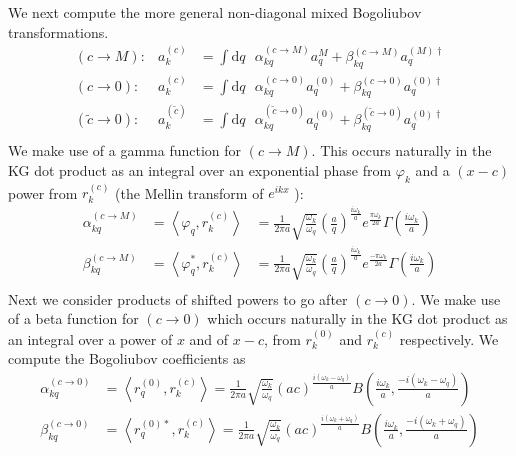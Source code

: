 \documentclass[12pt,a4paper]{article}
\newcommand{\dv}[1]{\mathrm{d} #1 \text{ }}
\begin{document}
We next compute the more general non-diagonal mixed Bogoliubov transformations.
\begin{equation}
  \begin{array}{rll}
  (c \rightarrow M) : & a^{(c)}_k &= \int \dv{q} \alpha^{(c \rightarrow M)}_{kq} a^{M}_q + \beta^{(c \rightarrow M)}_{kq} a^{(M)\dagger}_q \\
  (c \rightarrow 0) : &   a^{(c)}_k &= \int \dv{q} \alpha^{(c \rightarrow 0)}_{kq} a^{(0)}_q + \beta^{(c \rightarrow 0)}_{kq} a^{(0)\dagger}_q \\
  (\widetilde{c} \rightarrow 0) : &   a^{(\tilde{c})}_k &= \int \dv{q} \alpha^{(\widetilde{c} \rightarrow 0)}_{kq} a^{(0)}_q + \beta^{(\widetilde{c} \rightarrow 0)}_{kq} a^{(0)\dagger}_q \\
  \end{array}
\end{equation}
We make use of a gamma function for $(c \rightarrow M)$. This occurs naturally in the KG dot product as an integral over an exponential phase from $\varphi_k$ and a $(x-c)$ power from $r_k^{(c)}$ (the Mellin transform of $e^{ikx}$ \cite{bracewell1966fourier}):
\begin{equation}
  \begin{array}{ccl}
    \alpha^{(c \rightarrow M)}_{kq} &= \left<\varphi_q, r_k^{(c)} \right> &= \frac{1}{2 \pi a} \sqrt{\frac{\omega_k}{\omega_q}} \left(\frac{a}{q}\right)^{\frac{i\omega_k}{a}} e^{\frac{\pi \omega_k}{2a}} \Gamma\left(\frac{i\omega_k}{a}\right) \\
    \beta^{(c \rightarrow M)}_{kq} &= \left<\varphi_q^*, r_k^{(c)} \right> &= \frac{1}{2 \pi a} \sqrt{\frac{\omega_k}{\omega_q}} \left(\frac{a}{q}\right)^{\frac{i\omega_k}{a}} e^{\frac{-\pi \omega_k}{2a}} \Gamma\left(\frac{i\omega_k}{a}\right) \\
  \end{array}
  \label{bogoCM}
\end{equation}
Next we consider products of shifted powers to go after $(c \rightarrow 0)$. We make use of a beta function for $(c \rightarrow 0)$ which occurs naturally in the KG dot product as an integral over a power of $x$ and of $x-c$, from $r_k^{(0)}$ and $r_k^{(c)}$ respectively.  We compute the Bogoliubov coefficients as
\begin{equation}
  \begin{aligned}
    \alpha^{(c \rightarrow 0)}_{kq} &= \left<r_q^{(0)}, r_k^{(c)} \right> = \frac{1}{2 \pi a}\sqrt{\frac{\omega_k}{\omega_q}} (ac)^{\frac{i(\omega_k - \omega_q)}{a}} B\left(\frac{i\omega_k}{a}, \frac{-i(\omega_k - \omega_q)}{a}\right) \\
    \beta^{(c \rightarrow 0)}_{kq} &= \left<r_q^{(0)*}, r_k^{(c)} \right> = \frac{1}{2 \pi a}\sqrt{\frac{\omega_k}{\omega_q}} (ac)^{\frac{i(\omega_k + \omega_q)}{a}} B\left(\frac{i\omega_k}{a}, \frac{-i(\omega_k + \omega_q)}{a}\right) \\
  \end{aligned}
  \label{bogoC0}
\end{equation}
\end{document}
